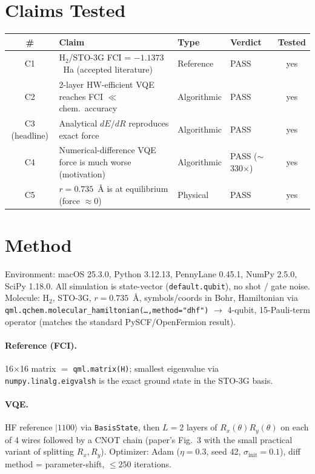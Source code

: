 \documentclass[11pt]{article}
\begin{document}
\section{Claims Tested}
\begin{center}
\small
\begin{tabular}{@{}clllc@{}}
\toprule
\# & Claim & Type & Verdict & Tested \\
\midrule
C1 & H$_2$/STO-3G FCI = $-1.1373$~Ha (accepted literature)      & Reference    & PASS   & yes \\
C2 & 2-layer HW-efficient VQE reaches FCI $\ll$ chem.\ accuracy & Algorithmic  & PASS   & yes \\
C3 (headline) & Analytical $dE/dR$ reproduces exact force        & Algorithmic  & PASS   & yes \\
C4 & Numerical-difference VQE force is much worse (motivation)  & Algorithmic  & PASS ($\sim$330$\times$) & yes \\
C5 & $r=0.735$~\AA{} is at equilibrium (force $\approx 0$)      & Physical     & PASS   & yes \\
\bottomrule
\end{tabular}
\end{center}

\section{Method}
Environment: macOS 25.3.0, Python 3.12.13, PennyLane 0.45.1, NumPy 2.5.0, SciPy 1.18.0. All simulation
is state-vector (\texttt{default.qubit}), no shot / gate noise. Molecule: H$_2$, STO-3G, $r=0.735$~\AA{},
symbols/coords in Bohr, Hamiltonian via \texttt{qml.qchem.molecular\_hamiltonian(\ldots,\allowbreak method="dhf")}
$\rightarrow$ 4-qubit, 15-Pauli-term operator (matches the standard PySCF/OpenFermion result).

\paragraph{Reference (FCI).} 16$\times$16 matrix $=$ \texttt{qml.matrix(H)}; smallest eigenvalue via
\texttt{numpy.linalg.eigvalsh} is the exact ground state in the STO-3G basis.

\paragraph{VQE.} HF reference $|1100\rangle$ via \texttt{BasisState}, then $L{=}2$ layers of
$R_x(\theta)R_y(\theta)$ on each of 4 wires followed by a CNOT chain (paper's Fig.~3 with the small
practical variant of splitting $R_x, R_y$). Optimizer: Adam ($\eta=0.3$, seed 42, $\sigma_{\text{init}}=0.1$),
diff method = parameter-shift, $\leq 250$ iterations.
\end{document}
